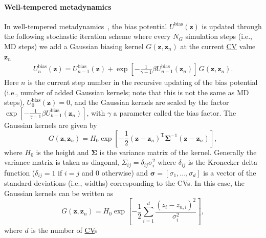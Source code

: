 \documentclass[9pt,review]{livecoms}
\newcommand{\vz}{\mathbf{z}}
\begin{document}
\paragraph{Well-tempered metadynamics}
\label{sec:wtmetad}
In well-tempered metadynamics~\cite{Barducci-PRL-2008}, the bias potential $U^{\mathrm{bias}}(\vz)$ is updated through the following stochastic iteration scheme where every $N_G$ simulation steps (i.e., MD steps) we add a Gaussian biasing kernel $G(\vz,\vz_n)$ at the current \hyperlink{ref:CV} {CV} value $\vz_n$
\begin{align}
\label{wtmetad_update}
U^{\mathrm{bias}}_{n}(\vz) = U^{\mathrm{bias}}_{n-1}(\vz) +
\exp \left[-\frac{1}{\gamma-1} \beta  U^{\mathrm{bias}}_{n-1}(\vz_n)   \right]
\, G(\vz,\vz_{n}). 
\end{align}
Here $n$ is the current step number in the recursive updating of the bias potential (i.e., number of added Gaussian kernels; note that this is not the same as MD steps), $U^{\mathrm{bias}}_{0}(\vz)=0$, and the Gaussian kernels are scaled by the factor $\exp \left[-\frac{1}{\gamma-1}
\beta U^{\mathrm{bias}}_{k-1}(\vz_n)   \right]$, with $\gamma$ a parameter called the bias factor. The Gaussian kernels are given by
\begin{equation}
G(\vz,\vz_n)=H_{0}\exp \left[-\frac{1}{2} \left(\vz-\vz_n\right)^{\mathrm{T}}\boldsymbol{\Sigma}^{-1}\left(\vz-\vz_n\right)\right],
\end{equation}
where $H_{0}$ is the height and $\boldsymbol{\Sigma}$ is the variance matrix of the kernel. Generally the variance matrix is taken as diagonal, $\Sigma_{ij}= \delta_{ij} \sigma_{i}^{2}$ where $\delta_{ij}$ is the Kronecker delta function ($\delta_{ij}=1$ if $i=j$ and 0 otherwise) and $\boldsymbol{\sigma}=[\sigma_1,\ldots,\sigma_d]$ is a vector of the standard deviations (i.e., widths) corresponding to the CVs. In this case, the Gaussian kernels can be written as
\begin{equation}
G(\vz,\vz_n)=H_{0} \exp \left[-\frac{1}{2}\sum^{d}_{i=1} \frac{(z_i-z_{n,i})^2}{\sigma^2_i} \right],
\end{equation}
where $d$ is the number of \hyperlink{ref:CV} {CV}s
\end{document}
